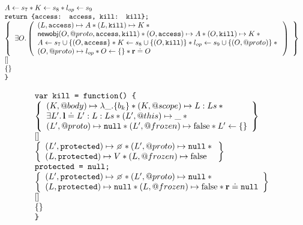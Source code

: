 \documentclass[a4paper]{article}
\begin{document}
\[\begin{array}{l}
{      A \leftarrow s_7 \mathbin{*}K \leftarrow s_8 \mathbin{*}l_{op}\leftarrow s_9
    } \\
    \mbox{\texttt{{\upshape return \{access: access, kill: kill\};}}} \\
    \left\{ \begin{array}{l} 
      \exists O \mathpunct{.}
      \left(\begin{array}{l}
      (L, \mbox{\texttt{{\upshape access}}}) \mapsto A \mathbin{*} (L, \mbox{\texttt{{\upshape kill}}}) \mapsto K \mathbin{*} {} \\
      \mathsf{newobj}(O, @proto, \mbox{\texttt{{\upshape access}}}, \mbox{\texttt{{\upshape kill}}}) \mathbin{*} (O,\mbox{\texttt{{\upshape access}}}) \mapsto
        A \mathbin{*} (O,\mbox{\texttt{{\upshape kill}}}) \mapsto K \mathbin{*} {} \\
      A \leftarrow s_7 \cup \{(O, \mbox{\texttt{{\upshape access}}}\} \mathbin{*} K \leftarrow s_8 \cup \{(O, \mbox{\texttt{{\upshape kill}}})\}
        \mathbin{*} l_{op} \leftarrow s_9 \cup \{(O,@proto)\} \mathbin{*} {} \\
      (O,@proto) \mapsto l_{op} \mathbin{*} O \leftarrow \{\} \mathbin{*} {\mathrm{\textbf{r}}} \doteq O
      \end{array}\right)
     \end{array} \right\} \\
    \text{[]} \\
    \left\{ \begin{array}{l} 

     \end{array} \right\} \\
    \mbox{\texttt{{\upshape \}}}}
  \end{array}
\]

\[
  \begin{array}{l}
    \js{var kill = function() \{} \\
    \logic{
      (K, @body) \mapsto \lambda \_.\{b_k\} \sep (K, @scope) \mapsto L:Ls \sep {} \\
      \exists L' \st \ls \doteq L' : L : Ls \sep (L',@this) \mapsto \_ \sep {} \\
      (L',@proto) \mapsto \nil \sep (L',@frozen) \mapsto \false \sep L' \bp \{\}
    } \\
    \step{} \\
    \logic{
      (L',\js{protected}) \mapsto \none \sep (L',@proto) \mapsto \nil \sep {} \\
      (L, \js{protected}) \mapsto V \sep
      (L,@frozen) \mapsto \false
    } \\
    \js{protected = null;} \\
    \logic{
      (L',\js{protected}) \mapsto \none \sep (L',@proto) \mapsto \nil \sep {} \\
      (L, \js{protected}) \mapsto \nil \sep
      (L,@frozen) \mapsto \false \sep \rv \doteq \nil
    } \\
    \step{} \\
    \logic{

    } \\
    \js{\}}
  \end{array}
\]
\end{document}
